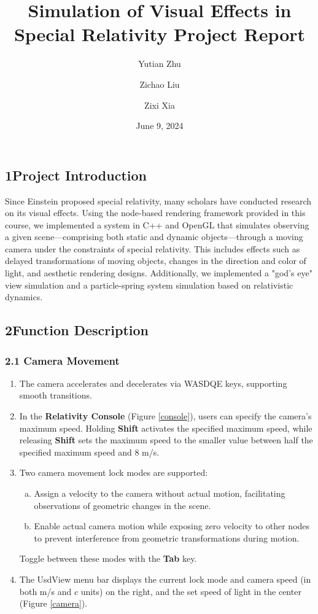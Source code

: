 \documentclass{article}
\title{\textbf{Simulation of Visual Effects in Special Relativity} \quad Project Report}
\author{Yutian Zhu \and Zichao Liu \and Zixi Xia}
\date{June 9, 2024}
\begin{document}
\maketitle
\thispagestyle{fancy}
\subsection*{1\quad Project Introduction}

Since Einstein proposed special relativity, many scholars have conducted research on its visual effects. Using the node-based rendering framework provided in this course, we implemented a system in C++ and OpenGL that simulates observing a given scene—comprising both static and dynamic objects—through a moving camera under the constraints of special relativity. This includes effects such as delayed transformations of moving objects, changes in the direction and color of light, and aesthetic rendering designs. Additionally, we implemented a "god's eye" view simulation and a particle-spring system simulation based on relativistic dynamics.

\subsection*{2\quad Function Description}

\subsubsection*{2.1 Camera Movement}

\begin{enumerate}[(1)]
    \item The camera accelerates and decelerates via WASDQE keys, supporting smooth transitions.
    \item In the \textbf{Relativity Console} (Figure \ref{console}), users can specify the camera's maximum speed. Holding \textbf{Shift} activates the specified maximum speed, while releasing \textbf{Shift} sets the maximum speed to the smaller value between half the specified maximum speed and 8 m/s.
    \item Two camera movement lock modes are supported:
    \begin{enumerate}[(a)]
        \item Assign a velocity to the camera without actual motion, facilitating observations of geometric changes in the scene.
        \item Enable actual camera motion while exposing zero velocity to other nodes to prevent interference from geometric transformations during motion.
    \end{enumerate}
    Toggle between these modes with the \textbf{Tab} key.
    \item The UsdView menu bar displays the current lock mode and camera speed (in both m/s and \( c \) units) on the right, and the set speed of light in the center (Figure \ref{camera}).
\end{enumerate}
\end{document}
